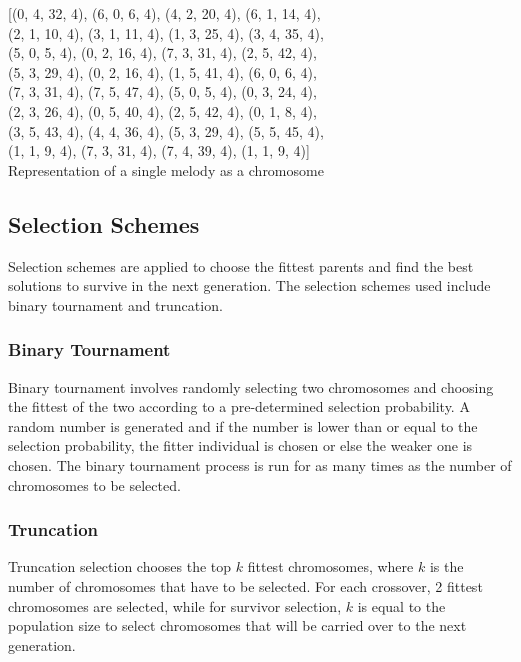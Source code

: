 \documentclass[conference]{IEEEtran}
\begin{document}
\begin{center}
    [(0, 4, 32, 4), (6, 0, 6, 4), (4, 2, 20, 4), (6, 1, 14, 4),\\ (2, 1, 10, 4), (3, 1, 11, 4), (1, 3, 25, 4), (3, 4, 35, 4),\\ (5, 0, 5, 4), (0, 2, 16, 4), (7, 3, 31, 4), (2, 5, 42, 4),\\ (5, 3, 29, 4), (0, 2, 16, 4), (1, 5, 41, 4), (6, 0, 6, 4),\\ (7, 3, 31, 4), (7, 5, 47, 4), (5, 0, 5, 4), (0, 3, 24, 4),\\ (2, 3, 26, 4), (0, 5, 40, 4), (2, 5, 42, 4), (0, 1, 8, 4),\\ (3, 5, 43, 4), (4, 4, 36, 4), (5, 3, 29, 4), (5, 5, 45, 4),\\ (1, 1, 9, 4), (7, 3, 31, 4), (7, 4, 39, 4), (1, 1, 9, 4)]\\
    
    Representation of a single melody as a chromosome
\end{center}

\subsection{Selection Schemes}
Selection schemes are applied to choose the fittest parents and find the best solutions to survive in the next generation. The selection schemes used include binary tournament and truncation.

\subsubsection{Binary Tournament}
Binary tournament involves randomly selecting two chromosomes and choosing the fittest of the two according to a pre-determined selection probability. A random number is generated and if the number is lower than or equal to the selection probability, the fitter individual is chosen or else the weaker one is chosen. The binary tournament process is run for as many times as the number of chromosomes to be selected.

\subsubsection{Truncation}
Truncation selection chooses the top $k$ fittest chromosomes, where $k$ is the number of chromosomes that have to be selected. For each crossover, 2 fittest chromosomes are selected, while for survivor selection, $k$ is equal to the population size to select chromosomes that will be carried over to the next generation.
\end{document}
